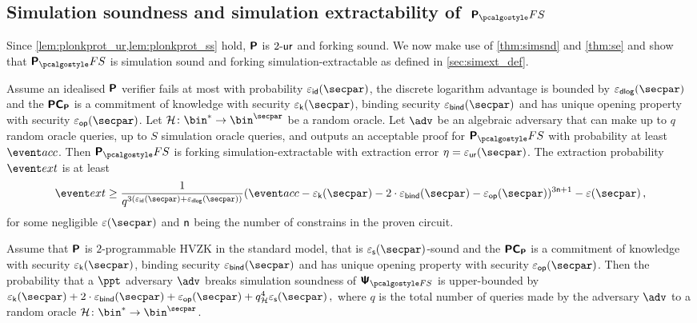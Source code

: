 \documentclass[runningheads,11pt]{llncs}
\begin{document}
\subsection{Simulation soundness and simulation
  extractability of~$\plonkprotfs$}
Since \cref{lem:plonkprot_ur,lem:plonkprot_ss} hold, $\bm{\mathsf{P}}$ is ${2\text{-}\mathsf{ur}}$
and forking sound. We now make use of \cref{thm:simsnd} and \cref{thm:se} and show that
$\plonkprot_\fs$ is simulation sound and forking simulation-extractable as defined in
\cref{sec:simext_def}.

\begin{corollary}
\label{thm:plonkprotfs_se}
Assume an idealised $\bm{\mathsf{P}}$ verifier fails at most with probability
$\epsid(\secpar)$, the discrete logarithm advantage is bounded by
$\epsdlog(\secpar)$ and the $\bm{\mathsf{PC}}_{\bm{\mathsf{P}}}$ is a commitment of knowledge with security
$\epsk(\secpar)$, binding security $\epsbind(\secpar)$ and has unique opening
property with security $\epsop(\secpar)$. Let
$\ro\colon \bin^* \to \bin^\secpar$ be a random oracle. Let $\advse$ be an
algebraic adversary that can make up to $q$ random oracle queries, up to $S$
simulation oracle queries, and outputs an acceptable proof for $\plonkprotfs$
with probability at least $\accProb$. Then $\plonkprotfs$ is forking
simulation-extractable with extraction error $\eta = \epsur(\secpar)$. The
extraction probability $\extProb$ is at least
\[
	\extProb \geq \frac{1}{q^{3 (\epsid(\secpar)+\epsdlog(\secpar))}} (\accProb - \epsk(\secpar) - 2\cdot\epsbind(\secpar) -
  \epsop(\secpar))^{3\noofc + 1} -\eps(\secpar)\,,
\]
for some negligible $\eps(\secpar)$ and $\mathsf{n}$ being the number of
constrains in the proven circuit.
\end{corollary}

\begin{corollary}
  \label{thm:simsnd}
  Assume that $\bm{\mathsf{P}}$ is $2$-programmable HVZK in the standard model, that
  is $\epss(\secpar)$-sound and the $\bm{\mathsf{PC}}_{\bm{\mathsf{P}}}$ is a commitment of knowledge with
  security $\epsk(\secpar)$, binding security $\epsbind(\secpar)$ and has unique
  opening property with security $\epsop(\secpar)$. Then the probability that a
  $\ppt$ adversary $\adv$ breaks simulation soundness of $\ps_{\fs}$ is
  upper-bounded by
  \( \epsk(\secpar) + 2\cdot\epsbind(\secpar) + \epsop(\secpar) + q_\ro^4
  \epss(\secpar)\,, \) where $q$ is the total number of queries made by the
  adversary $\adv$ to a random oracle $\ro\colon \bin^{*} \to \bin^{\secpar}$.
\end{corollary}
\end{document}
